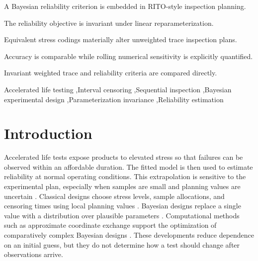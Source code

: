 \documentclass[a4paper,fleqn]{cas-sc}
\begin{document}
\begingroup
\def\casprelimstitle{Parameterization-Invariant Sequential Inspection Planning}
\begin{highlights}
\item A Bayesian reliability criterion is embedded in RITO-style inspection planning.
\item The reliability objective is invariant under linear reparameterization.
\item Equivalent stress codings materially alter unweighted trace inspection plans.
\item Accuracy is comparable while rolling numerical sensitivity is explicitly quantified.
\item Invariant weighted trace and reliability criteria are compared directly.
\end{highlights}
\endgroup

\begin{keywords}
Accelerated life testing \sep Interval censoring \sep Sequential inspection \sep Bayesian experimental design \sep Parameterization invariance \sep Reliability estimation
\end{keywords}

\begingroup
\hfuzz=118pt
\maketitle
\endgroup
\onehalfspacing

\section{Introduction}

Accelerated life tests expose products to elevated stress so that failures can be observed within an affordable duration. The fitted model is then used to estimate reliability at normal operating conditions. This extrapolation is sensitive to the experimental plan, especially when samples are small and planning values are uncertain \citep{nelson2009,meeker2021}. Classical designs choose stress levels, sample allocations, and censoring times using local planning values \citep{chernoff1962}. Bayesian designs replace a single value with a distribution over plausible parameters \citep{chalonerverdinelli1995,zhangmeeker2006,hong2015}. Computational methods such as approximate coordinate exchange support the optimization of comparatively complex Bayesian designs \citep{overstallwoods2017}. These developments reduce dependence on an initial guess, but they do not determine how a test should change after observations arrive.
\end{document}
